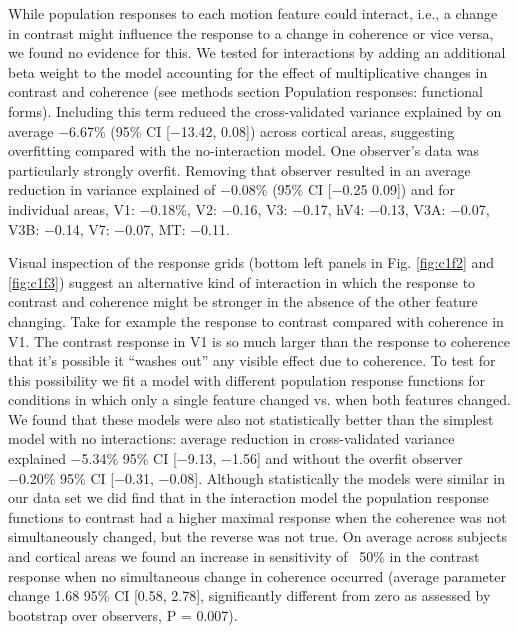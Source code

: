 \documentclass{report}
\begin{document}
While population responses to each motion feature could interact, i.e., a change in contrast might influence the response to a change in coherence or vice versa, we found no evidence for this. We tested for interactions by adding an additional beta weight to the model accounting for the effect of multiplicative changes in contrast and coherence (see methods section Population responses: functional forms). Including this term reduced the cross-validated variance explained by on average −6.67\% (95\% CI [−13.42, 0.08]) across cortical areas, suggesting overfitting compared with the no-interaction model. One observer’s data was particularly strongly overfit. Removing that observer resulted in an average reduction in variance explained of −0.08\% (95\% CI [−0.25 0.09]) and for individual areas, V1: −0.18\%, V2: −0.16, V3: −0.17, hV4: −0.13, V3A: −0.07, V3B: −0.14, V7: −0.07, MT: −0.11.

Visual inspection of the response grids (bottom left panels in Fig. \ref{fig:c1f2} and \ref{fig:c1f3}) suggest an alternative kind of interaction in which the response to contrast and coherence might be stronger in the absence of the other feature changing. Take for example the response to contrast compared with coherence in V1. The contrast response in V1 is so much larger than the response to coherence that it’s possible it ``washes out'' any visible effect due to coherence. To test for this possibility we fit a model with different population response functions for conditions in which only a single feature changed vs. when both features changed. We found that these models were also not statistically better than the simplest model with no interactions: average reduction in cross-validated variance explained −5.34\% 95\% CI [−9.13, −1.56] and without the overfit observer −0.20\% 95\% CI [−0.31, −0.08]. Although statistically the models were similar in our data set we did find that in the interaction model the population response functions to contrast had a higher maximal response when the coherence was not simultaneously changed, but the reverse was not true. On average across subjects and cortical areas we found an increase in sensitivity of ~50\% in the contrast response when no simultaneous change in coherence occurred (average parameter change 1.68 95\% CI [0.58, 2.78], significantly different from zero as assessed by bootstrap over observers, P = 0.007).
\end{document}
